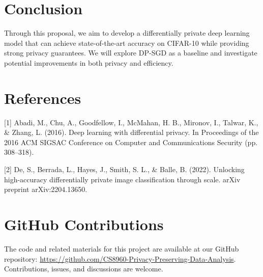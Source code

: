\documentclass{article}
\begin{document}
\section{Conclusion}
Through this proposal, we aim to develop a differentially private deep learning model that can achieve state-of-the-art accuracy on CIFAR-10 while providing strong privacy guarantees. We will explore DP-SGD as a baseline and investigate potential improvements in both privacy and efficiency.

\section*{References}
\small{
[1] Abadi, M., Chu, A., Goodfellow, I., McMahan, H. B., Mironov, I., Talwar, K., \& Zhang, L. (2016). Deep learning with differential privacy. In Proceedings of the 2016 ACM SIGSAC Conference on Computer and Communications Security (pp. 308–318).

[2] De, S., Berrada, L., Hayes, J., Smith, S. L., \& Balle, B. (2022). Unlocking high-accuracy differentially private image classification through scale. arXiv preprint arXiv:2204.13650.
}

\section*{GitHub Contributions}
The code and related materials for this project are available at our GitHub repository: \url{https://github.com/CS8960-Privacy-Preserving-Data-Analysis}. Contributions, issues, and discussions are welcome.
\end{document}
